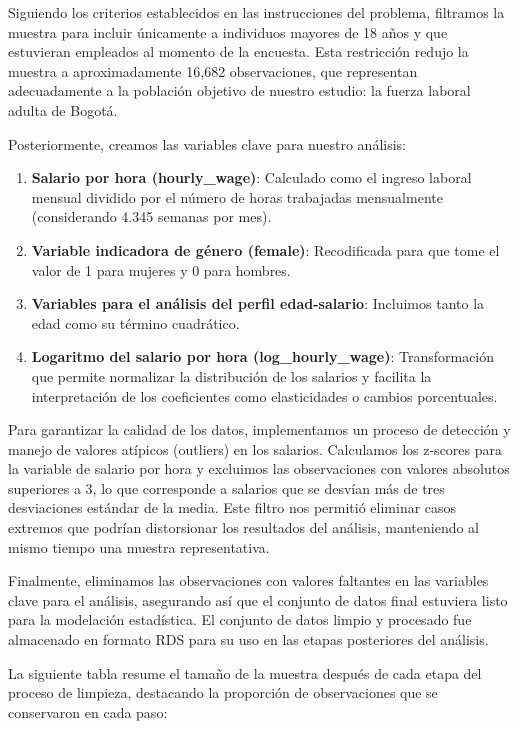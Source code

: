 \documentclass[12pt,a4paper,onecolumn]{article}
\begin{document}
Siguiendo los criterios establecidos en las instrucciones del problema, filtramos la muestra para incluir únicamente a individuos mayores de 18 años y que estuvieran empleados al momento de la encuesta. Esta restricción redujo la muestra a aproximadamente 16,682 observaciones, que representan adecuadamente a la población objetivo de nuestro estudio: la fuerza laboral adulta de Bogotá.


Posteriormente, creamos las variables clave para nuestro análisis:

\begin{enumerate}
    \item \textbf{Salario por hora (hourly\_wage)}: Calculado como el ingreso laboral mensual dividido por el número de horas trabajadas mensualmente (considerando 4.345 semanas por mes).
    \item \textbf{Variable indicadora de género (female)}: Recodificada para que tome el valor de 1 para mujeres y 0 para hombres.
    \item \textbf{Variables para el análisis del perfil edad-salario}: Incluimos tanto la edad como su término cuadrático.
    \item \textbf{Logaritmo del salario por hora (log\_hourly\_wage)}: Transformación que permite normalizar la distribución de los salarios y facilita la interpretación de los coeficientes como elasticidades o cambios porcentuales.
\end{enumerate}


Para garantizar la calidad de los datos, implementamos un proceso de detección y manejo de valores atípicos (outliers) en los salarios. Calculamos los z-scores para la variable de salario por hora y excluimos las observaciones con valores absolutos superiores a 3, lo que corresponde a salarios que se desvían más de tres desviaciones estándar de la media. Este filtro nos permitió eliminar casos extremos que podrían distorsionar los resultados del análisis, manteniendo al mismo tiempo una muestra representativa.


Finalmente, eliminamos las observaciones con valores faltantes en las variables clave para el análisis, asegurando así que el conjunto de datos final estuviera listo para la modelación estadística. El conjunto de datos limpio y procesado fue almacenado en formato RDS para su uso en las etapas posteriores del análisis.


La siguiente tabla resume el tamaño de la muestra después de cada etapa del proceso de limpieza, destacando la proporción de observaciones que se conservaron en cada paso:
\end{document}
